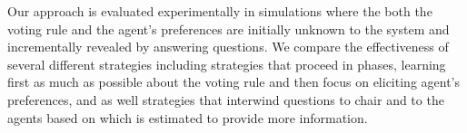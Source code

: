 \documentclass{article}
\begin{document}
Our approach is evaluated experimentally in simulations where the both the voting rule and the agent's preferences are initially unknown to the system and incrementally revealed by answering questions.
We compare the effectiveness of several different strategies  including strategies that proceed in phases, learning first as much as possible about the voting rule and then focus on eliciting agent's preferences, and as well strategies that interwind questions to chair and to the agents based on which is estimated to provide more information.



\end{document}
